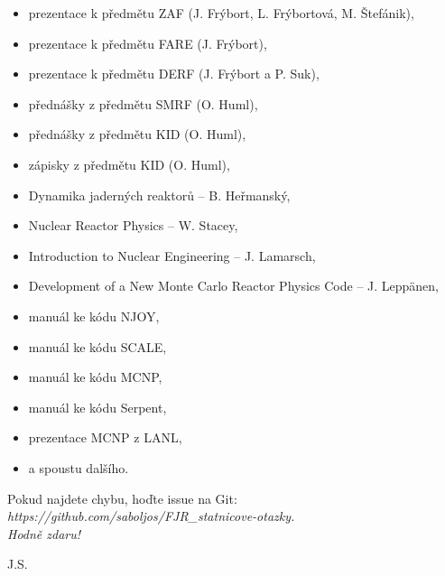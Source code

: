\documentclass[a4paper, 11pt]{article}
\begin{document}
\begin{itemize}
    \item prezentace k předmětu ZAF (J. Frýbort, L. Frýbortová, M. Štefánik),
    \item prezentace k předmětu FARE (J. Frýbort),
    \item prezentace k předmětu DERF (J. Frýbort a P. Suk),
    \item přednášky z předmětu SMRF (O. Huml),
    \item přednášky z předmětu KID (O. Huml),
    \item zápisky z předmětu KID (O. Huml),
    \item Dynamika jaderných reaktorů -- B. Heřmanský,
    \item Nuclear Reactor Physics -- W. Stacey,
    \item Introduction to Nuclear Engineering -- J. Lamarsch,
    \item Development of a New Monte Carlo Reactor Physics Code -- J. Leppänen,
    \item manuál ke kódu NJOY,
    \item manuál ke kódu SCALE,
    \item manuál ke kódu MCNP,
    \item manuál ke kódu Serpent,
    \item prezentace MCNP z LANL,
    \item a spoustu dalšího.
\end{itemize}

Pokud najdete chybu, hoďte issue na Git: \it{https://github.com/saboljos/FJR\_statnicove-otazky}.\\

\rm Hodně zdaru!

\rm J.S.

\vspace{2em}

\clearpage{\pagestyle{empty}}



\newpage
\parskip=0pt
\begin{small}
\tableofcontents
\end{small}
\parskip=7pt
\newpage
















% 
% 
% 
% 
% 
% 
% 
% 
% 
\end{document}
